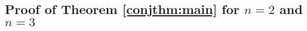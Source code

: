 \documentclass[a4paper]{amsart}
\theoremstyle{plain}
\newtheorem{prop}[thm]{Proposition}
\newtheorem{cor}[thm]{Corollary}
\theoremstyle{definition}
\begin{document}
% 
% 
% 

\subsection{Proof of Theorem \ref{conjthm:main} for \texorpdfstring{$n=2$}{n=2} and \texorpdfstring{$n=3$}{n=3}}
\end{document}
